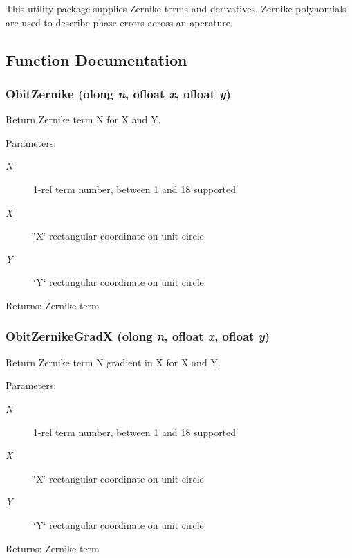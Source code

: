 This utility package supplies Zernike terms and derivatives. Zernike polynomials are used to describe phase errors across an aperature.

\subsection{Function Documentation}
\subsubsection{ Obit\-Zernike ({\bf olong} {\em n}, {\bf ofloat} {\em x}, {\bf ofloat} {\em y})}\label{ObitZernike_8h_a0}


Return Zernike term N for X and Y. 

\begin{Desc}
\item[Parameters:]
\begin{description}
\item[{\em N}]1-rel term number, between 1 and 18 supported \item[{\em X}]\char`\"{}X\char`\"{} rectangular coordinate on unit circle \item[{\em Y}]\char`\"{}Y\char`\"{} rectangular coordinate on unit circle \end{description}
\end{Desc}
\begin{Desc}
\item[Returns:]Zernike term \end{Desc}
\subsubsection{ Obit\-Zernike\-Grad\-X ({\bf olong} {\em n}, {\bf ofloat} {\em x}, {\bf ofloat} {\em y})}\label{ObitZernike_8h_a1}


Return Zernike term N gradient in X for X and Y. 

\begin{Desc}
\item[Parameters:]
\begin{description}
\item[{\em N}]1-rel term number, between 1 and 18 supported \item[{\em X}]\char`\"{}X\char`\"{} rectangular coordinate on unit circle \item[{\em Y}]\char`\"{}Y\char`\"{} rectangular coordinate on unit circle \end{description}
\end{Desc}
\begin{Desc}
\item[Returns:]Zernike term \end{Desc}
